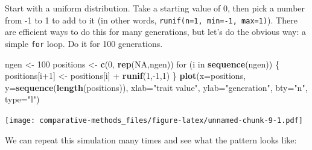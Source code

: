 \documentclass[]{book}
\newenvironment{Shaded}{\begin{snugshade}}{\end{snugshade}}
\newcommand{\KeywordTok}[1]{\textcolor[rgb]{0.13,0.29,0.53}{\textbf{{#1}}}}
\newcommand{\DataTypeTok}[1]{\textcolor[rgb]{0.13,0.29,0.53}{{#1}}}
\newcommand{\DecValTok}[1]{\textcolor[rgb]{0.00,0.00,0.81}{{#1}}}
\newcommand{\StringTok}[1]{\textcolor[rgb]{0.31,0.60,0.02}{{#1}}}
\newcommand{\OtherTok}[1]{\textcolor[rgb]{0.56,0.35,0.01}{{#1}}}
\newcommand{\NormalTok}[1]{{#1}}
\theoremstyle{definition}
\theoremstyle{definition}
\theoremstyle{remark}
\begin{document}
Start with a uniform distribution. Take a starting value of 0, then pick
a number from -1 to 1 to add to it (in other words,
\texttt{runif(n=1,\ min=-1,\ max=1)}). There are efficient ways to do
this for many generations, but let's do the obvious way: a simple
\texttt{for} loop. Do it for 100 generations.

\begin{Shaded}
\begin{Highlighting}[]
\NormalTok{ngen <-}\StringTok{ }\DecValTok{100}
\NormalTok{positions <-}\StringTok{ }\KeywordTok{c}\NormalTok{(}\DecValTok{0}\NormalTok{, }\KeywordTok{rep}\NormalTok{(}\OtherTok{NA}\NormalTok{,ngen))}
\NormalTok{for (i in }\KeywordTok{sequence}\NormalTok{(ngen)) \{}
  \NormalTok{positions[i}\DecValTok{+1}\NormalTok{] <-}\StringTok{ }\NormalTok{positions[i] +}\StringTok{ }\KeywordTok{runif}\NormalTok{(}\DecValTok{1}\NormalTok{,-}\DecValTok{1}\NormalTok{,}\DecValTok{1}\NormalTok{)}
\NormalTok{\}}
\KeywordTok{plot}\NormalTok{(}\DataTypeTok{x=}\NormalTok{positions, }\DataTypeTok{y=}\KeywordTok{sequence}\NormalTok{(}\KeywordTok{length}\NormalTok{(positions)), }\DataTypeTok{xlab=}\StringTok{"trait value"}\NormalTok{, }\DataTypeTok{ylab=}\StringTok{"generation"}\NormalTok{, }\DataTypeTok{bty=}\StringTok{"n"}\NormalTok{, }\DataTypeTok{type=}\StringTok{"l"}\NormalTok{)}
\end{Highlighting}
\end{Shaded}

\texttt{[image: comparative-methods\_files/figure-latex/unnamed-chunk-9-1.pdf]}

We can repeat this simulation many times and see what the pattern looks
like:
\end{document}
